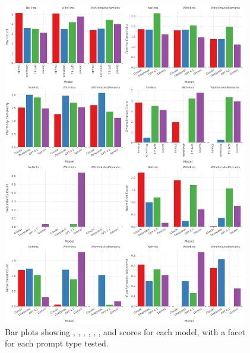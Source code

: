 \documentclass[12pt,a4paper,openright,twoside]{book}
\begin{document}
\begin{figure}[htbp]
    \centering
    \includegraphics[width=0.95\textwidth]{figures/prompt-stats.pdf}
    \caption{Bar plots showing \PC{}, \CC{}, \PBC{}, \GC{}, \RR{}, \NGC{}, \NBC{} and \GSA{} scores for each model, with a facet for each prompt type tested.}
    \label{fig:prompt-stats}
\end{figure}
\end{document}
